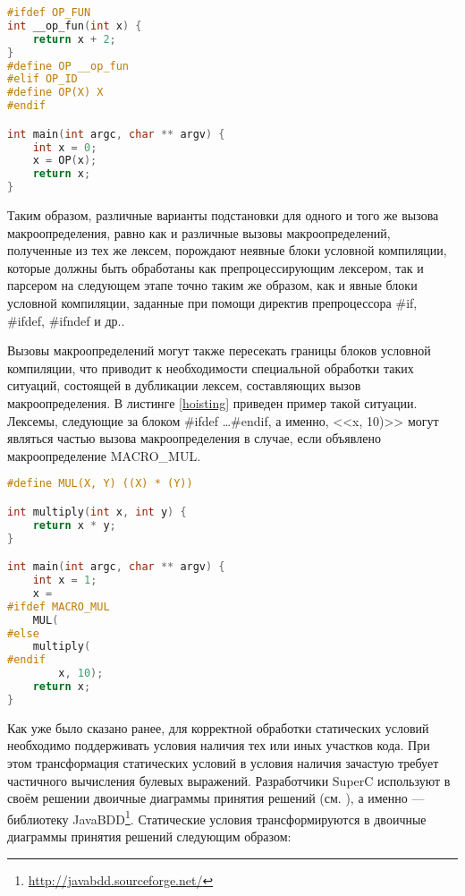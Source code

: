 \begin{minipage}{\linewidth}
\begin{lstlisting}[caption={Различные вызовы макроопределения при различных конфигурациях препроцессора},language=C,label=macrocalls]
#ifdef OP_FUN
int __op_fun(int x) {
	return x + 2;
}
#define OP __op_fun
#elif OP_ID
#define OP(X) X
#endif

int main(int argc, char ** argv) {
	int x = 0;
	x = OP(x);
	return x;	
}
\end{lstlisting}
\end{minipage}

Таким образом, различные варианты подстановки для одного и того же вызова макроопределения, равно как и различные вызовы макроопределений, полученные из тех же лексем, порождают неявные блоки условной компиляции, которые должны быть обработаны как препроцессирующим лексером, так и парсером на следующем этапе точно таким же образом, как и явные блоки условной компиляции, заданные при помощи директив препроцессора \#if, \#ifdef, \#ifndef и др..

Вызовы макроопределений могут также пересекать границы блоков условной компиляции, что приводит к необходимости специальной обработки таких ситуаций, состоящей в дубликации лексем, составляющих вызов макроопределения. В листинге \ref{hoisting} приведен пример такой ситуации. Лексемы, следующие за блоком \#ifdef \dots \#endif, а именно, <<x, 10)>> могут являться частью вызова макроопределения в случае, если объявлено макроопределение MACRO\_MUL.

\begin{minipage}{\linewidth}
\begin{lstlisting}[caption={Вызов макроопределения пересекает границу блока условной компиляции},language=C,label=hoisting]
#define MUL(X, Y) ((X) * (Y))

int multiply(int x, int y) {
	return x * y;
}

int main(int argc, char ** argv) {
	int x = 1;
	x =
#ifdef MACRO_MUL
	MUL(
#else
	multiply(
#endif
		x, 10);
	return x;	
}
\end{lstlisting}
\end{minipage}

Как уже было сказано ранее, для корректной обработки статических условий необходимо поддерживать условия наличия тех или иных участков кода. При этом трансформация статических условий в условия наличия зачастую требует частичного вычисления булевых выражений. Разработчики SuperC используют в своём решении двоичные диаграммы принятия решений (см. \cite{bdd}), а именно --- библиотеку JavaBDD\footnote{\url{http://javabdd.sourceforge.net/}}. Статические условия трансформируются в двоичные диаграммы принятия решений следующим образом:

